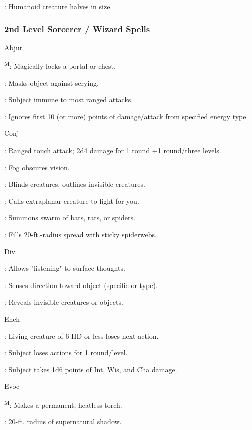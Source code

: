 : Humanoid creature halves in size.

\subsubsection{2nd Level Sorcerer / Wizard Spells}

Abjur

\textsuperscript{M}: Magically locks a portal or chest.

: Masks object against scrying.

: Subject immune to most ranged attacks.

: Ignores first 10 (or more) points of damage/attack from specified energy type.

Conj

: Ranged touch attack; 2d4 damage for 1 round +1 round/three levels.

: Fog obscures vision.

: Blinds creatures, outlines invisible creatures.

: Calls extraplanar creature to fight for you.

: Summons swarm of bats, rats, or spiders.

: Fills 20-ft.-radius spread with sticky spiderwebs.

Div

: Allows "listening" to surface thoughts.

: Senses direction toward object (specific or type).

: Reveals invisible creatures or objects.

Ench

: Living creature of 6 HD or less loses next action.

: Subject loses actions for 1 round/level.

: Subject takes 1d6 points of Int, Wis, and Cha damage.

Evoc

\textsuperscript{M}: Makes a permanent, heatless torch.

: 20-ft. radius of supernatural shadow.

